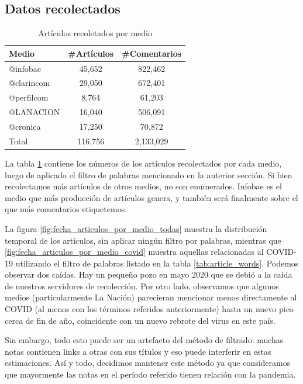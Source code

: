 \subsection{Datos recolectados}

\begin{table}[t]
    \centering
    \begin{tabular}{l|c|c}
    Medio      & \#Artículos & \#Comentarios \\
    \hline
    @infobae   &  45,652   &  822,462 \\
    @clarincom &  29,050   &  672,401 \\
    @perfilcom &  8,764    &  61,203  \\
    @LANACION  &  16,040   &  506,091 \\
    @cronica   &  17,250   &  70,872 \\
    \hline
    Total      & 116,756  & 2,133,029 \\
    \end{tabular}
    \caption{Artículos recoletados por medio}
    \label{tab:articulos_recoletados_por_medio}
\end{table}


La tabla \ref{tab:articulos_recoletados_por_medio} contiene los números de los artículos recolectados por cada medio, luego de aplicado el filtro de palabras mencionado en la anterior sección. Si bien recolectamos más artículos de otros medios, no son enumerados. Infobae es el medio que más producción de artículos genera, y también será finalmente sobre el que más comentarios etiquetemos.

La figura \ref{fig:fecha_articulos_por_medio_todas} muestra la distribución temporal de los artículos, sin aplicar ningún filtro por palabras, mientras que \ref{fig:fecha_articulos_por_medio_covid} muestra aquellas relacionadas al COVID-19 utilizando el filtro de palabras listado en la tabla \ref{tab:article_words}. Podemos observar dos caídas. Hay un pequeño pozo en mayo 2020 que se debió a la caída de nuestros servidores de recolección. Por otro lado, observamos que algunos medios (particularmente La Nación) parecieran mencionar menos directamente al COVID (al menos con los términos referidos anteriormente) hasta un nuevo pico cerca de fin de año, coincidente con un nuevo rebrote del virus en este país.

Sin embargo, todo esto puede ser un artefacto del método de filtrado: muchas notas contienen links a otras con sus títulos y eso puede interferir en estas estimaciones. Así y todo, decidimos mantener este método ya que consideramos que mayormente las notas en el período referido tienen relación con la pandemia.

